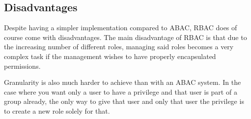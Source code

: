 \subsection*{Disadvantages}
Despite having a simpler implementation compared to ABAC, RBAC does of course come with disadvantages. The main disadvantage of RBAC is that due to the increasing number of different roles, managing said roles becomes a very complex task if the management wishes to have properly encapsulated permissions.

Granularity is also much harder to achieve than with an ABAC system. In the case where you want only a user to have a privilege and that user is part of a group already, the only way to give that user and only that user the privilege is to create a new role solely for that.